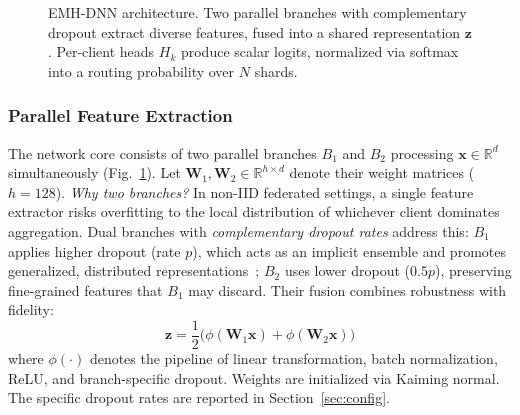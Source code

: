 \documentclass[conference]{IEEEtran}
\begin{document}
\begin{figure}[t]
{%
}
\caption{EMH-DNN architecture. Two parallel branches with complementary dropout extract diverse features, fused into a shared representation $\mathbf{z}$. Per-client heads $H_k$ produce scalar logits, normalized via softmax into a routing probability over $N$ shards.}
\label{fig:arch}
\end{figure}

\subsubsection{Parallel Feature Extraction}

The network core consists of two parallel branches $B_1$ and $B_2$ processing $\mathbf{x} \in \mathbb{R}^d$ simultaneously (Fig.~\ref{fig:arch}). Let $\mathbf{W}_1, \mathbf{W}_2 \in \mathbb{R}^{h \times d}$ denote their weight matrices ($h = 128$). \emph{Why two branches?} In non-IID federated settings, a single feature extractor risks overfitting to the local distribution of whichever client dominates aggregation. Dual branches with \emph{complementary dropout rates} address this: $B_1$ applies higher dropout (rate $p$), which acts as an implicit ensemble and promotes generalized, distributed representations~\cite{karimireddy2022bucketing}; $B_2$ uses lower dropout ($0.5p$), preserving fine-grained features that $B_1$ may discard. Their fusion combines robustness with fidelity:
\begin{equation}
\mathbf{z} = \frac{1}{2}\big(\phi(\mathbf{W}_1 \mathbf{x}) + \phi(\mathbf{W}_2 \mathbf{x})\big)
\label{eq:fusion}
\end{equation}
where $\phi(\cdot)$ denotes the pipeline of linear transformation, batch normalization, ReLU, and branch-specific dropout. Weights are initialized via Kaiming normal. The specific dropout rates are reported in Section~\ref{sec:config}.
\end{document}
